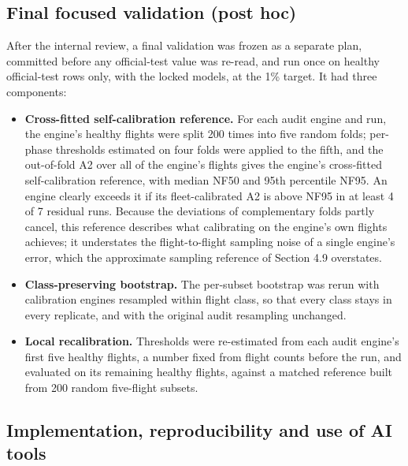 \documentclass[preprint,11pt,a4paper]{elsarticle}
\begin{document}
\subsection{Final focused validation (post hoc)}

After the internal review, a final validation was frozen as a separate plan, committed before any official-test value was re-read, and run once on healthy official-test rows only, with the locked models, at the 1\% target. It had three components:
\begin{itemize}
\item \textbf{Cross-fitted self-calibration reference.} For each audit engine and run, the engine's healthy flights were split 200 times into five random folds; per-phase thresholds estimated on four folds were applied to the fifth, and the out-of-fold A2 over all of the engine's flights gives the engine's cross-fitted self-calibration reference, with median NF50 and 95th percentile NF95. An engine clearly exceeds it if its fleet-calibrated A2 is above NF95 in at least 4 of 7 residual runs. Because the deviations of complementary folds partly cancel, this reference describes what calibrating on the engine's own flights achieves; it understates the flight-to-flight sampling noise of a single engine's error, which the approximate sampling reference of Section 4.9 overstates.
\item \textbf{Class-preserving bootstrap.} The per-subset bootstrap was rerun with calibration engines resampled within flight class, so that every class stays in every replicate, and with the original audit resampling unchanged.
\item \textbf{Local recalibration.} Thresholds were re-estimated from each audit engine's first five healthy flights, a number fixed from flight counts before the run, and evaluated on its remaining healthy flights, against a matched reference built from 200 random five-flight subsets.
\end{itemize}

\subsection{Implementation, reproducibility and use of AI tools}
\end{document}

